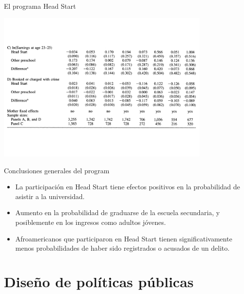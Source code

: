 \documentclass[11pt, aspectratio=169, compress]{beamer}
\begin{document}
\begin{frame}[t]{El programa Head Start}
	\vspace*{-2.5ex}
	\begin{center}
		\includegraphics[width=0.8\textwidth]{tab2}
	\end{center} 
\end{frame}
\begin{frame}[t]{Conclusiones generales del program}
	\begin{itemize}
		\item La participación en Head Start tiene efectos positivos en la probabilidad de asistir a la universidad.
		\item Aumento en la probabilidad de graduarse de la escuela secundaria, y posiblemente en los ingresos como adultos jóvenes. 
		\item Afroamericanos que participaron en Head Start tienen significativamente menos probabilidades de haber sido registrados o acusados de un delito.
	\end{itemize}
\end{frame}
\section{Diseño de políticas públicas}
\end{document}
